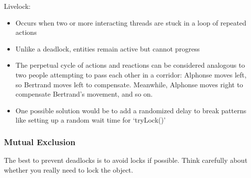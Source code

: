 \documentclass[letterpaper,12pt]{article}
\begin{document}
Livelock:\begin{itemize}
      \item Occurs when two or more interacting threads are stuck in a loop of repeated actions 
      \item Unlike a deadlock, entities remain active but cannot progress
      \item The perpetual cycle of actions and reactions can be considered analogous to two people attempting to pass each other in a corridor: Alphonse moves left, so Bertrand moves left to compensate. Meanwhile, Alphonse moves right to compensate Bertrand's movement, and so on.
      \item One possible solution would be to add a randomized delay to break patterns like setting up a random wait time for `tryLock()'
\end{itemize}

\subsubsection{Mutual Exclusion}
The best to prevent deadlocks is to avoid locks if possible. Think carefully about whether you really need to lock the object.
\end{document}
